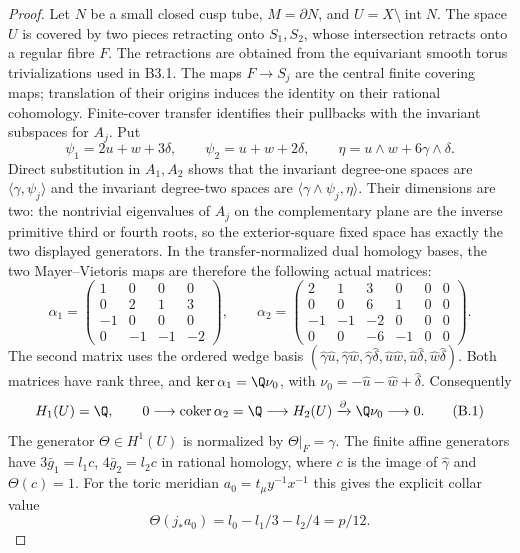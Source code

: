 \begin{proof}
Let $N$ be a small closed cusp tube, $M=\partial N$, and
$U=X\setminus\operatorname{int}N$. The space $U$ is covered by
two pieces retracting onto $S_1,S_2$, whose intersection retracts
onto a regular fibre $F$. The retractions are obtained from the
equivariant smooth torus trivializations used in B3.1. The maps
$F\to S_j$ are the central finite covering maps; translation of
their origins induces the identity on their rational cohomology.
Finite-cover transfer identifies their pullbacks with the invariant
subspaces for $A_j$. Put
\[
 \psi_1=2u+w+3\delta,\qquad \psi_2=u+w+2\delta,
 \qquad \eta=u\wedge w+6\gamma\wedge\delta.
\]
Direct substitution in $A_1,A_2$ shows that the invariant
degree-one spaces are $\langle\gamma,\psi_j\rangle$ and the
invariant degree-two spaces are
$\langle\gamma\wedge\psi_j,\eta\rangle$.
Their dimensions are two: the nontrivial eigenvalues of $A_j$ on
the complementary plane are the inverse primitive third or fourth
roots, so the exterior-square fixed space has exactly the two
displayed generators.
In the transfer-normalized dual homology bases, the two
Mayer--Vietoris maps are therefore the following actual matrices:
\[
 \alpha_1=\begin{pmatrix}
 1&0&0&0\\0&2&1&3\\-1&0&0&0\\0&-1&-1&-2
 \end{pmatrix},\qquad
 \alpha_2=\begin{pmatrix}
 2&1&3&0&0&0\\0&0&6&1&0&0\\
 -1&-1&-2&0&0&0\\0&0&-6&-1&0&0
 \end{pmatrix}.
\]
The second matrix uses the ordered wedge basis
$(\hat\gamma\hat u,\hat\gamma\hat w,\hat\gamma\hat\delta,
\hat u\hat w,\hat u\hat\delta,\hat w\hat\delta)$.
Both matrices have rank three, and
$\ker\alpha_1=\Q\nu_0$, with
$\nu_0=-\hat u-\hat w+\hat\delta$.
Consequently
\[
 H_1(U)=\Q,\qquad
 0\longrightarrow\operatorname{coker}\alpha_2=\Q
 \longrightarrow H_2(U)
 \xrightarrow{\partial}\Q\nu_0\longrightarrow0.       \tag{B.1}
\]
The generator $\Theta\in H^1(U)$ is normalized by
$\Theta|_F=\gamma$. The finite affine generators have
$3\bar g_1=l_1c$, $4\bar g_2=l_2c$ in rational homology, where
$c$ is the image of $\hat\gamma$ and $\Theta(c)=1$.
For the toric meridian $a_0=t_\mu y^{-1}x^{-1}$ this gives the
explicit collar value
\[
 \Theta(j_*a_0)=l_0-l_1/3-l_2/4=p/12.                 \tag{B.2}
\]


\end{proof}
